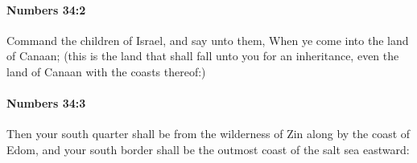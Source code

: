 		\paragraph{Numbers 34:2} %
			\label{NUMBERS-34-2}

			Command the children of Israel, and say unto them, When ye come into the land of Canaan; (this is the land that shall fall unto you for an inheritance, even the land of Canaan with the coasts thereof:)


		\paragraph{Numbers 34:3} %
			\label{NUMBERS-34-3}

			Then your south quarter shall be from the wilderness of Zin along by the coast of Edom, and your south border shall be the outmost coast of the salt sea eastward:


